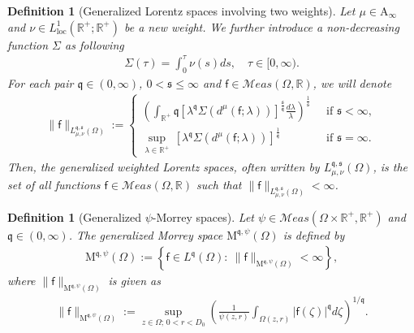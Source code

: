 \documentclass[a4paper, 11pt]{article}
\newtheorem{definition}[theorem]{Definition}
\begin{document}
\begin{definition}[Generalized Lorentz spaces involving two weights]
Let $\mu \in \mathrm{A}_{\infty}$ and $\nu \in L^1_{\mathrm{loc}}(\mathbb{R}^+;\mathbb{R}^+)$ be a new weight. We further introduce a non-decreasing function $\Sigma$ as following
\begin{align}\label{def:Gam}
\Sigma(\tau) = \int_0^{\tau} \nu(s) ds, \quad \tau \in [0,\infty).
\end{align}
For each pair $\mathfrak{q} \in (0,\infty)$, $0<\mathfrak{s} \le \infty$ and $\mathsf{f} \in \mathcal{M}eas(\Omega,\mathbb{R})$, we will denote
\begin{align}\label{GL-norm}
\|\mathsf{f}\|_{L^{\mathfrak{q},\mathfrak{s}}_{\mu,\nu}(\Omega)} := \begin{cases}  \left(\displaystyle{\int_{\mathbb{R}^+} \mathfrak{q} \left[\lambda^{\mathfrak{q}}\Sigma\left(d^{\mu}(\mathsf{f};\lambda)\right) \right]^{\frac{\mathfrak{s}}{\mathfrak{q}}} \frac{d\lambda}{\lambda}} \right)^{\frac{1}{\mathfrak{s}}} \ &\mbox{ if } \mathfrak{s}<\infty,\\ 
\displaystyle{\sup_{\lambda \in \mathbb{R}^+} \, \left[\lambda^{\mathfrak{q}}\Sigma\left(d^{\mu}(\mathsf{f};\lambda)\right)\right]^{\frac{1}{\mathfrak{q}}}} \ &\mbox{ if } \mathfrak{s}=\infty.\end{cases}
\end{align}
Then, the generalized weighted Lorentz spaces, often written by $L^{\mathfrak{q},\mathfrak{s}}_{\mu,\nu}(\Omega)$, is the set of all functions $\mathsf{f} \in \mathcal{M}eas(\Omega,\mathbb{R})$ such that $\|\mathsf{f}\|_{L^{\mathfrak{q},\mathfrak{s}}_{\mu,\nu}(\Omega)}<\infty$.
\end{definition}

\begin{definition}[Generalized $\psi$-Morrey spaces] Let $\psi \in \mathcal{M}eas(\Omega \times \mathbb{R}^+,\mathbb{R}^+)$ and $\mathfrak{q} \in (0, \infty)$. The generalized Morrey space $\mathrm{M}^{\mathfrak{q},\psi}(\Omega)$ is defined by
\begin{align*}
\mathrm{M}^{\mathfrak{q},\psi}(\Omega) := \left\{\mathsf{f} \in L^\mathfrak{q}(\Omega): \ \|\mathsf{f}\|_{\mathrm{M}^{\mathfrak{q},\psi}(\Omega)}<\infty\right\},
\end{align*}
where $\|\mathsf{f}\|_{\mathrm{M}^{\mathfrak{q},\psi}(\Omega)}$ is given as
\begin{align}\label{Morrey-norm}
\|\mathsf{f}\|_{\mathrm{M}^{\mathfrak{q},\psi}(\Omega)} :=  \sup_{z\in \Omega; \, 0<r<D_0} \left(\frac{1}{\psi(z,r)}\int_{\Omega(z,r)}|\mathsf{f}(\zeta)|^{\mathfrak{q}}d\zeta\right)^{1/\mathfrak{q}}.
\end{align}
\end{definition} 
\end{document}
